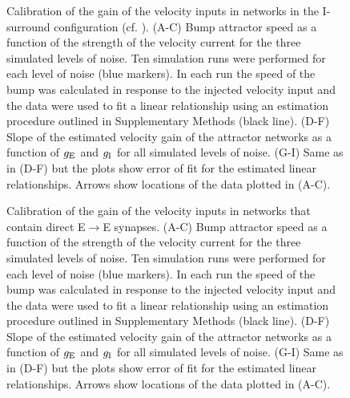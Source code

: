 \documentclass[a4paper,12pt]{article}
\newcommand{\ssc}[3]{\ensuremath{#1_{\text{#2}_{\text{#3}}}}}
\newcommand{\gE      }{\ssc{g}      {\scriptsize{E}}{}}
\newcommand{\gI      }{\ssc{g}      {\scriptsize{I}}{}}
\begin{document}
\begin{figure}[ht!]
    \internallinenumbers
    \centering
    \caption{Calibration of the gain of the velocity inputs in networks in the
    I-surround configuration (cf. \cite{Pastoll:2013ff}). (A-C) Bump attractor
    speed as a function of the strength of the velocity current for the three
    simulated levels of noise. Ten simulation runs were performed for each
    level of noise (blue markers). In each run the speed of the bump was
    calculated in response to the injected velocity input and the data were
    used to fit a linear relationship using an estimation procedure outlined in
    Supplementary Methods (black line). (D-F) Slope of the estimated velocity
    gain of the attractor networks as a function of $\gE$ and $\gI$ for all
    simulated levels of noise. (G-I) Same as in (D-F) but the plots show error
    of fit for the estimated linear relationships. Arrows show locations of the
    data plotted in (A-C).
    }
\end{figure}

\clearpage

\begin{figure}[ht!]
    \internallinenumbers
    \centering
    \caption{Calibration of the gain of the velocity inputs in networks that
    contain direct E$\rightarrow$E synapses. (A-C) Bump attractor speed as a
    function of the strength of the velocity current for the three simulated
    levels of noise. Ten simulation runs were performed for each level of noise
    (blue markers). In each run the speed of the bump was calculated in
    response to the injected velocity input and the data were used to fit a
    linear relationship using an estimation procedure outlined in Supplementary
    Methods (black line). (D-F) Slope of the estimated velocity gain of the
    attractor networks as a function of $\gE$ and $\gI$ for all simulated
    levels of noise. (G-I) Same as in (D-F) but the plots show error of fit for
    the estimated linear relationships. Arrows show locations of the data
    plotted in (A-C).
    }
\end{figure}
\end{document}
